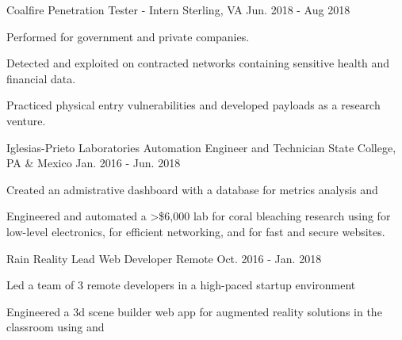 

\begin{cventries}
   
    
  \cventry
    {Coalfire} %
    {Penetration Tester - Intern} %
    {Sterling, VA} %
    {Jun. 2018 - Aug 2018} %
    {
      \begin{cvitems} %
      \item {Performed  for government and private companies.}
	  \item {Detected and exploited  on contracted networks containing sensitive health and financial data.}
      \item {Practiced physical entry vulnerabilities and developed  payloads as a research venture.}
      \end{cvitems}
    }
   
  \cventry
    {Iglesias-Prieto Laboratories} %
    {Automation Engineer and Technician} %
    {State College, PA \& Mexico} %
    {Jan. 2016 - Jun. 2018} %
    {
      \begin{cvitems} %
        \item {Created an admistrative dashboard with a  database for metrics analysis and }
	\item {Engineered and automated a >\$6,000 lab for coral bleaching research using  for low-level electronics,  for efficient networking, and  for fast and secure websites. }
      \end{cvitems}
    }

  \cventry
    {Rain Reality}
    {Lead Web Developer} %
    {Remote} %
    {Oct. 2016 - Jan. 2018 } %
    {
      \begin{cvitems} %
      \item { Led a team of 3 remote developers in a high-paced startup environment} 
      \item {Engineered a 3d scene builder web app for augmented reality solutions in the classroom using  and }
      \end{cvitems}
    }
\end{cventries}
